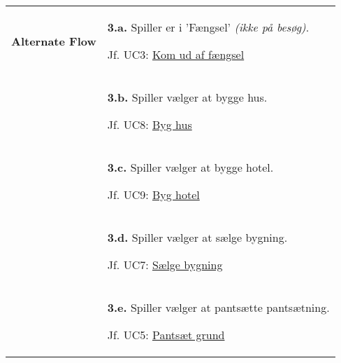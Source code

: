 \documentclass[class=article, crop=false]{standalone}
\begin{document}
\begin{table}[H]
\begin{tabularx}{\textwidth}{|l|X|}
                    \textbf{Alternate Flow}   & \textbf{3.a.} Spiller er i 'Fængsel' \textit{(ikke på besøg)}.
                    \begin{enumerate} \begin{tabenum}
                                          \item Jf. UC3: \underline{Kom ud af fængsel}
                    \end{tabenum} \end{enumerate}
                    \\


                                      & \textbf{3.b.} Spiller vælger at bygge hus.
            \begin{enumerate} \begin{tabenum}
                                  \item Jf. UC8: \underline{Byg hus}
            \end{tabenum} \end{enumerate}
            \\

                                    & \textbf{3.c.} Spiller vælger at bygge hotel.
                                    \begin{enumerate} \begin{tabenum}
                                                          \item Jf. UC9: \underline{Byg hotel}
                                    \end{tabenum} \end{enumerate}
                                    \\

                                    & \textbf{3.d.} Spiller vælger at sælge bygning.
                                    \begin{enumerate} \begin{tabenum}
                                                          \item Jf. UC7: \underline{Sælge bygning}
                                    \end{tabenum} \end{enumerate}
                                    \\


                            & \textbf{3.e.} Spiller vælger at pantsætte pantsætning.
                            \begin{enumerate} \begin{tabenum}
                                                  \item Jf. UC5: \underline{Pantsæt grund}
                            \end{tabenum} \end{enumerate}
                            \\



\end{tabularx}
\end{table}
\end{document}
